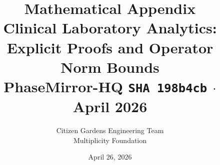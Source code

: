 \documentclass[11pt,a4paper]{article}
\begin{document}
\newcommand{\MAD}{\operatorname{MAD}}
\newcommand{\med}{\operatorname{median}}
\newcommand{\CV}{\operatorname{CV}}
\newcommand{\tr}{\operatorname{tr}}
\newcommand{\rank}{\operatorname{rank}}
\newcommand{\diag}{\operatorname{diag}}
\newcommand{\Cov}{\operatorname{Cov}}
\newcommand{\Var}{\operatorname{Var}}
\newcommand{\E}{\mathbb{E}}
\newcommand{\R}{\mathbb{R}}
\newcommand{\N}{\mathbb{N}}
\newcommand{\1}{\mathbbm{1}}
\newcommand{\norm}[1]{\left\lVert #1 \right\rVert}
\newcommand{\opnorm}[1]{\left\lVert #1 \right\rVert_{\mathrm{op}}}
\newcommand{\fnorm}[1]{\left\lVert #1 \right\rVert_{\mathrm{F}}}
\newcommand{\abs}[1]{\left| #1 \right|}
\newcommand{\floor}[1]{\left\lfloor #1 \right\rfloor}
\newcommand{\ceil}[1]{\left\lceil #1 \right\rceil}
\newcommand{\bX}{\bm{X}}
\newcommand{\bZ}{\bm{Z}}
\newcommand{\bmu}{\bm{\mu}}
\newcommand{\bSigma}{\bm{\Sigma}}
\newcommand{\bLambda}{\bm{\Lambda}}
\newcommand{\hSigma}{\hat{\bSigma}}
\newcommand{\hSigmaLW}{\hat{\bSigma}_{\mathrm{LW}}}
\newcommand{\hSigmaS}{\hat{\bSigma}_{\mathrm{S}}}
\DeclareMathOperator*{\argmin}{arg\,min}

\title{%
  \Large\bfseries Mathematical Appendix\\[0.4em]
  \large Clinical Laboratory Analytics: Explicit Proofs and Operator Norm Bounds\\[0.2em]
  \normalsize\normalfont PhaseMirror-HQ \texttt{SHA 198b4cb} $\cdot$ April 2026
}
\author{Citizen Gardens Engineering Team \\ Multiplicity Foundation}
\date{April 26, 2026}
\end{document}

